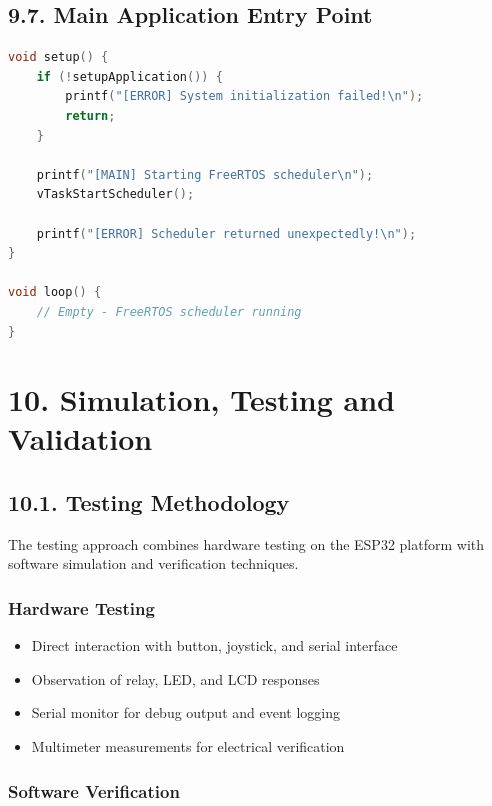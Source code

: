 \documentclass[12pt]{article}
\begin{document}
\subsection*{9.7. Main Application Entry Point}

\begin{lstlisting}[language=C++, caption=Main Application (main.cpp)]
void setup() {
    if (!setupApplication()) {
        printf("[ERROR] System initialization failed!\n");
        return;
    }
    
    printf("[MAIN] Starting FreeRTOS scheduler\n");
    vTaskStartScheduler();
    
    printf("[ERROR] Scheduler returned unexpectedly!\n");
}

void loop() {
    // Empty - FreeRTOS scheduler running
}
\end{lstlisting}

\section*{10. Simulation, Testing and Validation}

\subsection*{10.1. Testing Methodology}

The testing approach combines hardware testing on the ESP32 platform with software simulation and verification techniques.

\subsubsection*{Hardware Testing}

\begin{itemize}
    \item Direct interaction with button, joystick, and serial interface
    \item Observation of relay, LED, and LCD responses
    \item Serial monitor for debug output and event logging
    \item Multimeter measurements for electrical verification
\end{itemize}

\subsubsection*{Software Verification}
\end{document}
